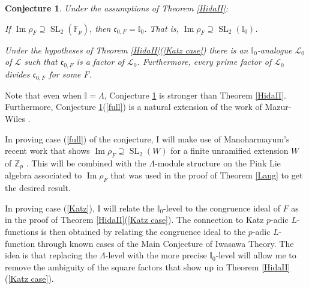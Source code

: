 \documentclass[11pt]{amsart}
\newtheorem{conj}{Conjecture}
\theoremstyle{definition}
\theoremstyle{remark}
\def\cc{\mathfrak{c}}
\def\F{\mathbb{F}}
\def\I{\mathbb{I}}
\def\aL{\mathcal{L}}
\def\Z{\mathbb{Z}}
\DeclareMathOperator{\im}{Im}
\DeclareMathOperator{\SL}{SL}
\begin{document}
\begin{conj}\label{level}
Under the assumptions of Theorem \ref{HidaII}:
\begin{enumerate*}
\item\label{full} If $\im \rho_F \supseteq \SL_2(\F_p)$, then $\cc_{0,F} = \I_0$.  That is, $\im \rho_F \supseteq \SL_2(\I_0)$.
\item\label{Katz} Under the hypotheses of Theorem \ref{HidaII}(\ref{Katz case}) there is an $\I_0$-analogue $\aL_0$ of $\aL$ such that $\cc_{0,F}$ is a factor of $\aL_0$.  Furthermore, every prime factor of $\aL_0$ divides $\cc_{0, F}$ for some $F$. 
\end{enumerate*}
\end{conj}

Note that even when $\I = \Lambda$, Conjecture \ref{level} is stronger than Theorem \ref{HidaII}.  Furthermore, Conjecture \ref{level}(\ref{full}) is a natural extension of the work of  Mazur-Wiles \cite{MazurWiles86}.

In proving case (\ref{full}) of the conjecture, I will make use of Manoharmayum's recent work that shows $\im \rho_F \supseteq \SL_2(W)$ for a finite unramified extension $W$ of $\Z_p$ \cite{Manoharmayum15}.  This will be combined with the $\Lambda$-module structure on the Pink Lie algebra associated to $\im \rho_F$ that was used in the proof of Theorem \ref{Lang} to get the desired result.

In proving case (\ref{Katz}), I will relate the $\I_0$-level to the congruence ideal of $F$ as in the proof of Theorem \ref{HidaII}(\ref{Katz case}).  The connection to Katz $p$-adic $L$-functions is then obtained by relating the congruence ideal to the $p$-adic $L$-function through known cases of the Main Conjecture of Iwasawa Theory.  The idea is that replacing the $\Lambda$-level with the more precise $\I_0$-level will allow me to remove the ambiguity of the square factors that show up in Theorem \ref{HidaII}(\ref{Katz case}).

\end{document}
